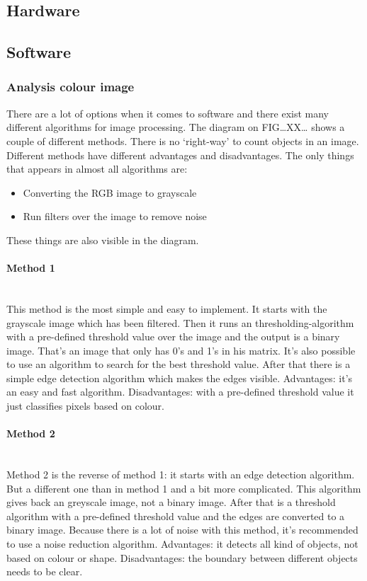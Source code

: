 \documentclass[11pt]{article}
\begin{document}
\subsection{Hardware}
\subsection{Software}
\subsubsection{Analysis colour image }

There are a lot of options when it comes to software and there exist many different algorithms for image processing. The diagram on FIG…XX… shows a couple of different methods. There is no ‘right-way’ to count objects in an image. Different methods have different advantages and disadvantages. The only things that appears in almost all algorithms are:
\begin{itemize}
\item Converting the RGB image to grayscale
\item Run filters over the image to remove noise
\end{itemize}
These things are also visible in the diagram.
\paragraph{Method 1}\mbox{}\\
This method is the most simple and easy to implement. It starts with the grayscale image which has been filtered. Then it runs an thresholding-algorithm with a pre-defined threshold value over the image and the output is a binary image. That’s an image that only has 0’s and 1’s in his matrix.  It’s also possible to use an algorithm to search for the best threshold value.  After that there is a simple edge detection algorithm which makes the edges visible. 
Advantages: it’s an easy and fast algorithm.
Disadvantages: with a pre-defined threshold value it just classifies pixels based on colour. 
\paragraph{Method 2}\mbox{}\\
Method 2 is the reverse of method 1: it starts with an edge detection algorithm. But a different one than in method 1 and a bit more complicated. This algorithm gives back an greyscale image, not a binary image. After that is a threshold algorithm with a pre-defined threshold value and the edges are converted to a binary image. Because there is a lot of noise with this method, it's recommended to use a noise reduction algorithm. 
Advantages: it detects all kind of objects, not based on colour or shape.
Disadvantages: the boundary between different objects needs to be clear.
\end{document}
